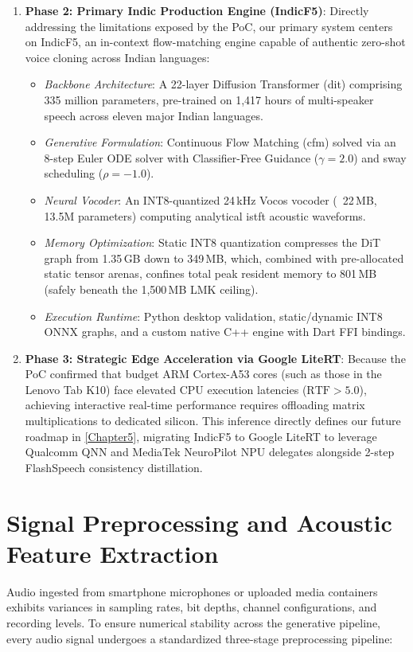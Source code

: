 \begin{enumerate}
    \item \textbf{Phase 2: Primary Indic Production Engine (IndicF5)}:
    Directly addressing the limitations exposed by the PoC, our primary system centers on IndicF5, an in-context flow-matching engine capable of authentic zero-shot voice cloning across Indian languages:
    \begin{itemize}
        \item \textit{Backbone Architecture}: A 22-layer Diffusion Transformer (\gls{dit}) comprising 335 million parameters, pre-trained on 1,417 hours of multi-speaker speech across eleven major Indian languages.
        \item \textit{Generative Formulation}: Continuous Flow Matching (\gls{cfm}) solved via an 8-step Euler ODE solver with Classifier-Free Guidance ($\gamma = 2.0$) and sway scheduling ($\rho = -1.0$).
        \item \textit{Neural Vocoder}: An INT8-quantized 24\,kHz Vocos vocoder (~22\,MB, 13.5M parameters) computing analytical \gls{istft} acoustic waveforms.
        \item \textit{Memory Optimization}: Static INT8 quantization compresses the DiT graph from 1.35\,GB down to 349\,MB, which, combined with pre-allocated static tensor arenas, confines total peak resident memory to 801\,MB (safely beneath the 1,500\,MB LMK ceiling).
        \item \textit{Execution Runtime}: Python desktop validation, static/dynamic INT8 ONNX graphs, and a custom native C++ engine with Dart FFI bindings.
    \end{itemize}
    
    \item \textbf{Phase 3: Strategic Edge Acceleration via Google LiteRT}:
    Because the PoC confirmed that budget ARM Cortex-A53 cores (such as those in the Lenovo Tab K10) face elevated CPU execution latencies ($\text{RTF} > 5.0$), achieving interactive real-time performance requires offloading matrix multiplications to dedicated silicon. This inference directly defines our future roadmap in \cref{Chapter5}, migrating IndicF5 to Google LiteRT to leverage Qualcomm QNN and MediaTek NeuroPilot NPU delegates alongside 2-step FlashSpeech consistency distillation.
\end{enumerate}

\section{Signal Preprocessing and Acoustic Feature Extraction}
Audio ingested from smartphone microphones or uploaded media containers exhibits variances in sampling rates, bit depths, channel configurations, and recording levels. To ensure numerical stability across the generative pipeline, every audio signal undergoes a standardized three-stage preprocessing pipeline:

